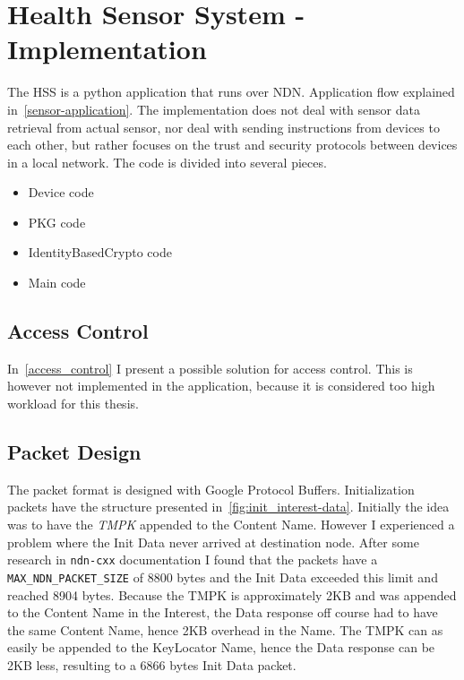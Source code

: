 \section{Health Sensor System - Implementation}
The \gls{HSS} is a python application that runs over \gls{NDN}.
Application flow explained in~\autoref{sensor-application}.
The implementation does not deal with sensor data retrieval from actual sensor, nor deal with sending instructions from devices to each other, but rather focuses on the trust and security protocols between devices in a local network.
The code is divided into several pieces.

\begin{itemize}
  \item Device code~\cite[device.py]{garseg15}
  \item \gls{PKG} code~\cite[publicKeyGenerator.py]{garseg15}
  \item IdentityBasedCrypto code~\cite[identityBasedCrypto.py]{garseg15}
  \item Main code~\cite[application.py]{garseg15}
\end{itemize}

\subsection{Access Control}
In~\autoref{access_control} I present a possible solution for access control.
This is however not implemented in the application, because it is considered too high workload for this thesis.

\subsection{Packet Design}
The packet format is designed with Google Protocol Buffers.
Initialization packets have the structure presented in~\autoref{fig:init_interest-data}.
Initially the idea was to have the \textit{\gls{TMPK}} appended to the Content Name. 
However I experienced a problem where the Init Data never arrived at destination node. 
After some research in \texttt{ndn-cxx} documentation I found that the packets have a \texttt{MAX\_NDN\_PACKET\_SIZE} of 8800 bytes and the Init Data exceeded this limit and reached 8904 bytes.
Because the \gls{TMPK} is approximately 2\gls{KB} and was appended to the Content Name in the Interest, the Data response off course had to have the same Content Name, hence 2\gls{KB} overhead in the Name. 
The \gls{TMPK} can as easily be appended to the KeyLocator Name, hence the Data response can be 2\gls{KB} less, resulting to a 6866 bytes Init Data packet.

